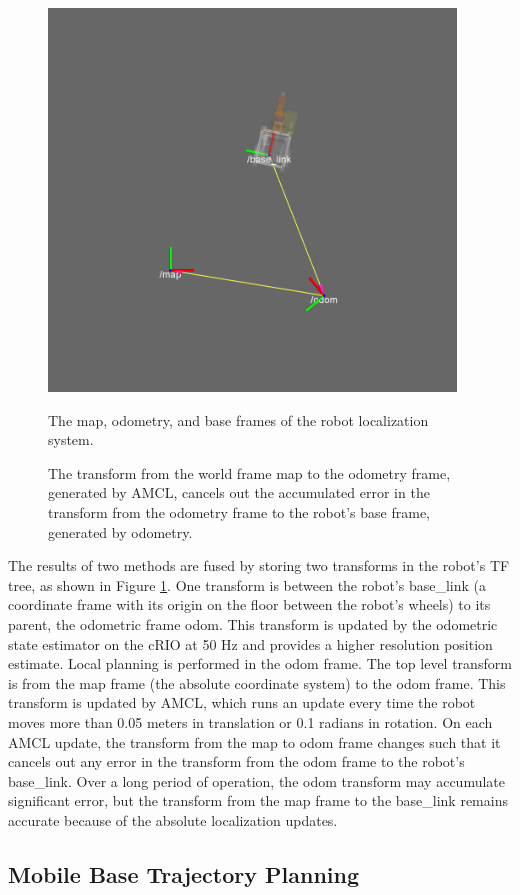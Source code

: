 \documentclass[]{cwru} %
\begin{document}
\begin{figure}[ht]
\centering
\includegraphics[height=4.0in]{odom_frames}
\caption{The map, odometry, and base frames of the robot localization system.}
\caption*{The transform from the world frame map to the odometry frame, 
generated by AMCL, cancels out the accumulated error in the transform from 
the odometry frame to the robot's base frame, generated by odometry.}
\label{fig:tfs}
\end{figure}

The results of two methods are fused by storing two transforms in the
robot's TF tree, as shown in Figure \ref{fig:tfs}. One transform is between the
robot's base\_link (a coordinate frame with its origin on the floor
between the robot's wheels) to its parent, the odometric frame odom.
This transform is updated by the odometric state estimator on the cRIO
at 50 Hz and provides a higher resolution position estimate. Local
planning is performed in the odom frame. The top level transform is from
the map frame (the absolute coordinate system) to the odom frame. This
transform is updated by AMCL, which runs an update every time the robot
moves more than 0.05 meters in translation or 0.1 radians in rotation.
On each AMCL update, the transform from the map to odom frame changes
such that it cancels out any error in the transform from the odom frame
to the robot's base\_link. Over a long period of operation, the odom
transform may accumulate significant error, but the transform from the
map frame to the base\_link remains accurate because of the absolute
localization updates.

\subsection{Mobile Base Trajectory Planning}
\end{document}
